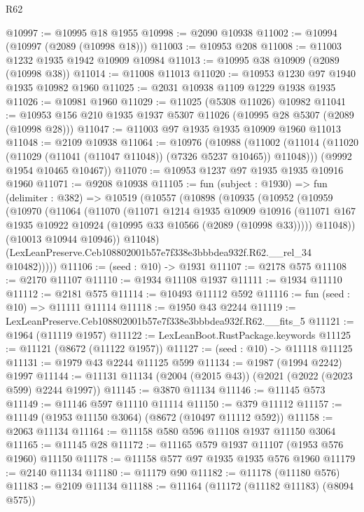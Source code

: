 \begin{lexlean}{R62}
\begin{coremodule}
@10997 := @10995 @18 @1955
@10998 := @2090 @10938
@11002 := @10994 (@10997 (@2089 (@10998 @18)))
@11003 := @10953 @208
@11008 := @11003 @1232 @1935 @1942 @10909 @10984
@11013 := @10995 @38 @10909 (@2089 (@10998 @38))
@11014 := @11008 @11013
@11020 := @10953 @1230 @97 @1940 @1935 @10982 @1960
@11025 := @2031 @10938 @1109 @1229 @1938 @1935
@11026 := @10981 @1960
@11029 := @11025 (@5308 @11026) @10982
@11041 := @10953 @156 @210 @1935 @1937 @5307 @11026 (@10995 @28 @5307 (@2089 (@10998 @28)))
@11047 := @11003 @97 @1935 @1935 @10909 @1960 @11013
@11048 := @2109 @10938
@11064 := @10976
    (@10988
      (@11002 (@11014 (@11020 (@11029 (@11041 (@11047 @11048)) (@7326 @5237 @10465)) @11048)))
      (@9992 @1954 @10465 @10467))
@11070 := @10953 @1237 @97 @1935 @1935 @10916 @1960
@11071 := @9208 @10938
@11105 := fun (subject : @1930) =>
  fun (delimiter : @382) =>
  @10519
    (@10557
      (@10898
        (@10935
          (@10952
            (@10959
              (@10970
                (@11064
                  (@11070
                    (@11071
                      @1214
                      @1935
                      @10909
                      @10916
                      (@11071 @167 @1935 @10922 @10924 (@10995 @33 @10566 (@2089 (@10998 @33)))))
                    @11048))
                (@10013 @10944 @10946))
              @11048)
            (LexLeanPreserve.Ceb108802001b57e7f338e3bbbdea932f.R62.__rel_34 @10482)))))
@11106 := (seed : @10) -> @1931
@11107 := @2178 @575
@11108 := @2170 @11107
@11110 := @1934 @11108 @1937
@11111 := @1934 @11110
@11112 := @2181 @575
@11114 := @10493 @11112 @592
@11116 := fun (seed : @10) => @11111 @11114
@11118 := @1950 @43 @2244
@11119 := LexLeanPreserve.Ceb108802001b57e7f338e3bbbdea932f.R62.__fits_5
@11121 := @1964 (@11119 @1957)
@11122 := LexLeanBoot.RustPackage.keywords
@11125 := @11121 (@8672 (@11122 @1957))
@11127 := (seed : @10) -> @11118 @11125
@11131 := @1979 @43 @2244 @11125 @599
@11134 := @1987 (@1994 @2242) @1997
@11144 := @11131 @11134 (@2004 (@2015 @43)) (@2021 (@2022 (@2023 @599) @2244 @1997))
@11145 := @3870 @11134
@11146 := @11145 @573
@11149 := @11146 @597 @11110 @11114
@11150 := @379 @11112
@11157 := @11149 (@1953 @11150 @3064) (@8672 (@10497 @11112 @592))
@11158 := @2063 @11134
@11164 := @11158 @580 @596 @11108 @1937 @11150 @3064
@11165 := @11145 @28
@11172 := @11165 @579 @1937 @11107 (@1953 @576 @1960) @11150
@11178 := @11158 @577 @97 @1935 @1935 @576 @1960
@11179 := @2140 @11134
@11180 := @11179 @90
@11182 := @11178 (@11180 @576)
@11183 := @2109 @11134
@11188 := @11164 (@11172 (@11182 @11183) (@8094 @575))

\end{coremodule}
\end{lexlean}
